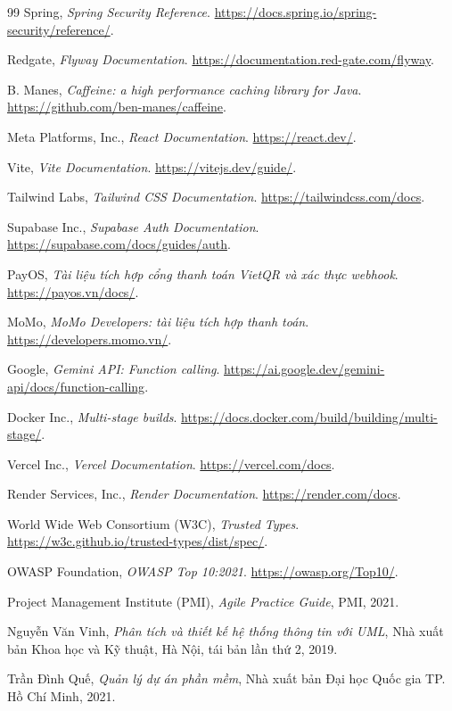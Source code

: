 \begin{thebibliography}{99}
Spring, \textit{Spring Security Reference}. \url{https://docs.spring.io/spring-security/reference/}.

Redgate, \textit{Flyway Documentation}. \url{https://documentation.red-gate.com/flyway}.

B. Manes, \textit{Caffeine: a high performance caching library for Java}. \url{https://github.com/ben-manes/caffeine}.

Meta Platforms, Inc., \textit{React Documentation}. \url{https://react.dev/}.

Vite, \textit{Vite Documentation}. \url{https://vitejs.dev/guide/}.

Tailwind Labs, \textit{Tailwind CSS Documentation}. \url{https://tailwindcss.com/docs}.

Supabase Inc., \textit{Supabase Auth Documentation}. \url{https://supabase.com/docs/guides/auth}.

PayOS, \textit{Tài liệu tích hợp cổng thanh toán VietQR và xác thực webhook}. \url{https://payos.vn/docs/}.

MoMo, \textit{MoMo Developers: tài liệu tích hợp thanh toán}. \url{https://developers.momo.vn/}.

Google, \textit{Gemini API: Function calling}. \url{https://ai.google.dev/gemini-api/docs/function-calling}.

Docker Inc., \textit{Multi-stage builds}. \url{https://docs.docker.com/build/building/multi-stage/}.

Vercel Inc., \textit{Vercel Documentation}. \url{https://vercel.com/docs}.

Render Services, Inc., \textit{Render Documentation}. \url{https://render.com/docs}.

World Wide Web Consortium (W3C), \textit{Trusted Types}. \url{https://w3c.github.io/trusted-types/dist/spec/}.

OWASP Foundation, \textit{OWASP Top 10:2021}. \url{https://owasp.org/Top10/}.

Project Management Institute (PMI), \textit{Agile Practice Guide}, PMI, 2021.

Nguyễn Văn Vinh, \textit{Phân tích và thiết kế hệ thống thông tin với UML}, Nhà xuất bản Khoa học và Kỹ thuật, Hà Nội, tái bản lần thứ 2, 2019.

Trần Đình Quế, \textit{Quản lý dự án phần mềm}, Nhà xuất bản Đại học Quốc gia TP. Hồ Chí Minh, 2021.

\end{thebibliography}


